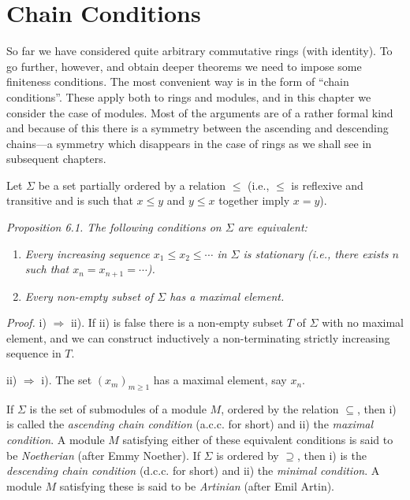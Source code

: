 \section{Chain Conditions}

So far we have considered quite arbitrary commutative rings (with identity). To go further, however, and obtain deeper theorems we need to impose some finiteness conditions. The most convenient way is in the form of ``chain conditions''. These apply both to rings and modules, and in this chapter we consider the case of modules. Most of the arguments are of a rather formal kind and because of this there is a symmetry between the ascending and descending chains---a symmetry which disappears in the case of rings as we shall see in subsequent chapters.

Let $\Sigma$ be a set partially ordered by a relation $\leq$ (i.e., $\leq$ is reflexive and transitive and is such that $x\leq y$ and $y\leq x$ together imply $x=y$).

\noindent\textit{Proposition 6.1. The following conditions on $\Sigma$ are equivalent:}
\begin{enumerate}
\renewcommand{\labelenumi}{\roman{enumi})}
\item \textit{Every increasing sequence $x_1\leq x_2\leq\cdots$ in $\Sigma$ is stationary (i.e., there exists $n$ such that $x_n=x_{n+1}=\cdots$).}
\item \textit{Every non-empty subset of $\Sigma$ has a maximal element.}
\end{enumerate}

\noindent\textit{Proof.} i) $\Rightarrow$ ii). If ii) is false there is a non-empty subset $T$ of $\Sigma$ with no maximal element, and we can construct inductively a non-terminating strictly increasing sequence in $T$.

ii) $\Rightarrow$ i). The set $(x_m)_{m\geq1}$ has a maximal element, say $x_n$. \proofbox

If $\Sigma$ is the set of submodules of a module $M$, ordered by the relation $\subseteq$, then i) is called the \textit{ascending chain condition} (a.c.c. for short) and ii) the \textit{maximal condition}. A module $M$ satisfying either of these equivalent conditions is said to be \textit{Noetherian} (after Emmy Noether). If $\Sigma$ is ordered by $\supseteq$, then i) is the \textit{descending chain condition} (d.c.c. for short) and ii) the \textit{minimal condition}. A module $M$ satisfying these is said to be \textit{Artinian} (after Emil Artin).

